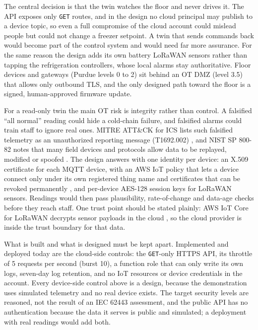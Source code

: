 \documentclass{article}
\newcommand{\code}[1]{\texttt{\small #1}}
\begin{document}
The central decision is that the twin watches the floor and never drives it.
The API exposes only \code{GET} routes, and in the design no cloud principal may
publish to a device topic, so even a full compromise of the cloud account
could mislead people but could not change a freezer setpoint. A twin that
sends commands back would become part of the control system and would need
far more assurance. For the same reason the design adds its own battery
LoRaWAN sensors rather than tapping the refrigeration controllers, whose local
alarms stay authoritative. Floor devices and gateways (Purdue levels 0 to 2)
sit behind an OT DMZ (level 3.5) that allows only outbound TLS, and the only
designed path toward the floor is a signed, human-approved firmware update.

For a read-only twin the main OT risk is integrity rather than control. A
falsified ``all normal'' reading could hide a cold-chain failure, and
falsified alarms could train staff to ignore real ones. MITRE ATT\&CK for ICS
lists such falsified telemetry as an unauthorized reporting message
(T1692.002) \cite{mitre_t1692}, and NIST SP 800-82 notes that many field
devices and protocols allow data to be replayed, modified or spoofed
\cite{nist80082r3}. The design answers with one identity per device: an X.509
certificate for each MQTT device, with an AWS IoT policy that lets a device
connect only under its own registered thing name
\cite{aws_iot_connect_policy} and certificates that can be revoked permanently
\cite{aws_iot_revoke}, and per-device AES-128 session keys for LoRaWAN
sensors. Readings would then pass plausibility, rate-of-change and data-age
checks before they reach staff. One trust point should be stated plainly:
AWS IoT Core for LoRaWAN decrypts sensor payloads in the cloud
\cite{aws_lorawan_security}, so the cloud provider is inside the trust
boundary for that data.

What is built and what is designed must be kept apart. Implemented and
deployed today are the cloud-side controls: the \code{GET}-only HTTPS API, its
throttle of 5 requests per second (burst 10), a function role that can only
write its own logs, seven-day log retention, and no IoT resources or device
credentials in the account. Every device-side control above is a design,
because the demonstration uses simulated telemetry and no real device exists.
The target security levels are reasoned, not the result of an IEC 62443
assessment, and the public API has no authentication because the data it
serves is public and simulated; a deployment with real readings would add
both.
\end{document}
